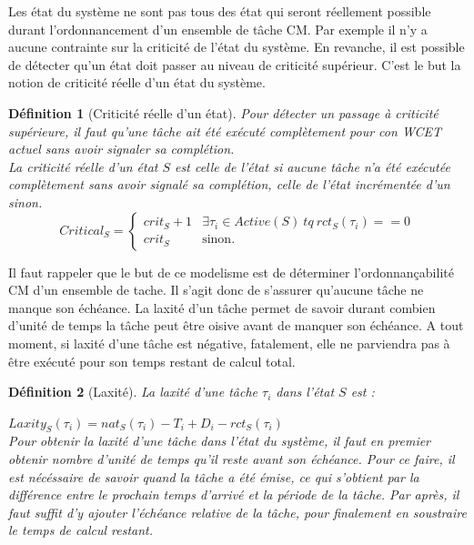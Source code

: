 \documentclass[12pt,a4paper,oneside]{book}
\theoremstyle{break}
\newtheorem{defin}{Définition}[chapter]
\theoremstyle{breakplain}
\begin{document}
Les état du système ne sont pas tous des état qui seront réellement possible durant l’ordonnancement d’un ensemble de tâche CM. Par exemple il n’y a aucune contrainte sur la criticité de l’état du système. En revanche, il est possible de détecter qu’un état doit passer au niveau de criticité supérieur. C’est le but la notion de criticité réelle d’un état du système.


\begin{defin}[Criticité réelle d'un état]
\label{spo:critical}
Pour détecter un passage à criticité supérieure, il faut qu'une tâche ait été exécuté complètement pour con WCET actuel sans avoir signaler sa complétion.\\
La criticité réelle d'un état $S$ est celle de l'état si aucune tâche n'a été exécutée complètement sans avoir signalé sa complétion, celle de l'état incrémentée d'un sinon.
$$
Critical_S = \left\{
    \begin{array}{ll}
        crit_S+1 & \exists \tau_i \in Active(S)\ tq\ rct_S(\tau_i) == 0 \\
        crit_S & \mbox{sinon.}
    \end{array}
\right.
$$
\end{defin}

Il faut rappeler que le but de ce modelisme est de déterminer l'ordonnançabilité CM d'un ensemble de tache. Il s'agit donc de s'assurer qu'aucune tâche ne manque son échéance. La laxité d'un tâche permet de savoir durant combien d'unité de temps la tâche peut être oisive avant de manquer son échéance. A tout moment, si laxité d'une tâche est négative, fatalement, elle ne parviendra pas à être exécuté pour son temps restant de calcul total.

\begin{defin}[Laxité]
\label{spo:laxity}
La laxité d'une tâche $\tau_i$ dans l'état $S$ est :

$Laxity_S(\tau_i) = nat_S(\tau_i) -T_i + D_i - rct_S(\tau_i)$\\

Pour obtenir la laxité d'une tâche dans l'état du système, il faut en premier obtenir nombre d'unité de temps qu'il reste avant son échéance. Pour ce faire, il est nécéssaire de savoir quand la tâche a été émise, ce qui s'obtient par la différence entre le prochain temps d'arrivé et la période de la tâche. Par après, il faut suffit d'y ajouter l'échéance relative de la tâche, pour finalement en soustraire le temps de calcul restant.
\end{defin}
\end{document}
